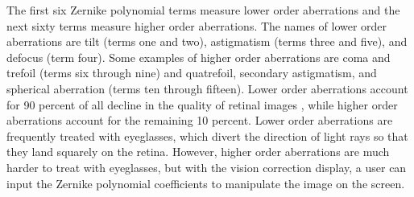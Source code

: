 The first six Zernike polynomial terms measure lower order aberrations and the next sixty terms measure higher order aberrations. The names of lower order aberrations are tilt (terms one and two), astigmatism (terms three and five), and defocus (term four). Some examples of higher order aberrations are coma and trefoil (terms six through nine) and quatrefoil, secondary astigmatism, and spherical aberration (terms ten through fifteen). Lower order aberrations account for 90 percent of all decline in the quality of retinal images \cite{DIAS-SANTOS:2014}, while higher order aberrations account for the remaining 10 percent. Lower order aberrations are frequently treated with eyeglasses, which divert the direction of light rays so that they land squarely on the retina. However, higher order aberrations are much harder to treat with eyeglasses, but with the vision correction display, a user can input the Zernike polynomial coefficients to manipulate the image on the screen. 






